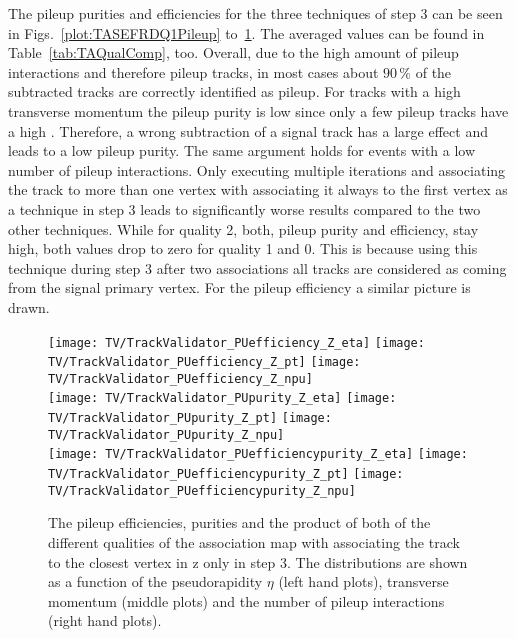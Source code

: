 The pileup purities and efficiencies for the three techniques of step 3 can be seen in Figs.~\ref{plot:TASEFRDQ1Pileup} to~\ref{plot:TASEFRDQZPileup}. The averaged values can be found in Table~\ref{tab:TAQualComp}, too. Overall, due to the high amount of pileup interactions and therefore pileup tracks, in most cases about $90\,\%$ of the subtracted tracks are correctly identified as pileup. For tracks with a high transverse momentum the pileup purity is low since only a few pileup tracks have a high \pt. Therefore, a wrong subtraction of a signal track has a large effect and leads to a low pileup purity. The same argument holds for events with a low number of pileup interactions. Only executing multiple iterations and associating the track to more than one vertex with associating it always to the first vertex as a technique in step 3 leads to significantly worse results compared to the two other techniques. While for quality 2, both, pileup purity and efficiency, stay high, both values drop to zero for quality 1 and 0. This is because using this technique during step 3 after two associations all tracks are considered as coming from the signal primary vertex. For the pileup efficiency a similar picture is drawn.

\begin{figure}[Ht]
    \centering
    \texttt{[image: TV/TrackValidator\_PUefficiency\_Z\_eta]}
    \texttt{[image: TV/TrackValidator\_PUefficiency\_Z\_pt]}
    \texttt{[image: TV/TrackValidator\_PUefficiency\_Z\_npu]}
    \\
    \texttt{[image: TV/TrackValidator\_PUpurity\_Z\_eta]}
    \texttt{[image: TV/TrackValidator\_PUpurity\_Z\_pt]}
    \texttt{[image: TV/TrackValidator\_PUpurity\_Z\_npu]}
    \\
    \texttt{[image: TV/TrackValidator\_PUefficiencypurity\_Z\_eta]}
    \texttt{[image: TV/TrackValidator\_PUefficiencypurity\_Z\_pt]}
    \texttt{[image: TV/TrackValidator\_PUefficiencypurity\_Z\_npu]}
    \caption[Pileup efficiencies, purities and their product of the different qualities of the association map with associating the track to the closest vertex in z only in step 3]{The pileup efficiencies, purities and the product of both of the different qualities of the association map with associating the track to the closest vertex in z only in step 3. The distributions are shown as a function of the pseudorapidity $\eta$ (left hand plots), transverse momentum (middle plots) and the number of pileup interactions (right hand plots). \label{plot:TASEFRDQZPileup}}
\end{figure}

